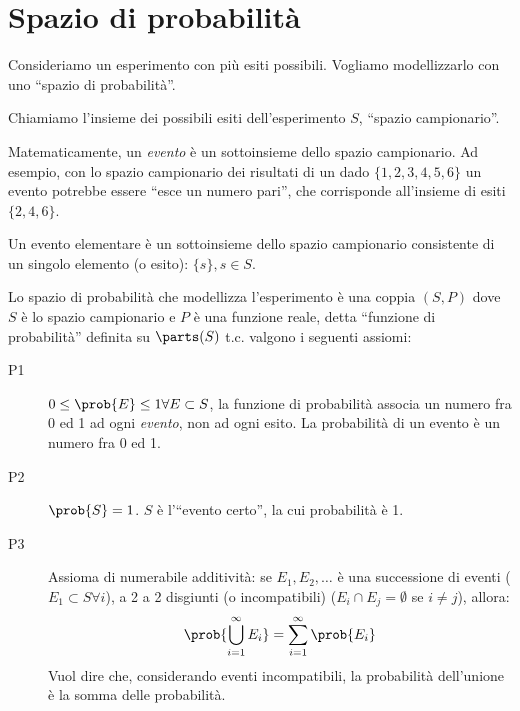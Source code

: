 
\section{Spazio di probabilit\`a}

Consideriamo un esperimento con pi\`u esiti possibili. Vogliamo modellizzarlo con uno ``spazio di probabilit\`a''.

\begin{defn}
Chiamiamo l'insieme dei possibili esiti dell'esperimento $S$, ``spazio campionario''.
\end{defn}

\begin{defn}[Evento]
Matematicamente, un \emph{evento} \`e un sottoinsieme dello spazio campionario. Ad esempio, con lo spazio campionario dei risultati di un dado $\{ 1, 2, 3, 4, 5, 6\}$ un evento potrebbe essere ``esce un numero pari'', che corrisponde all'insieme di esiti $\{2, 4, 6\}$.

Un evento elementare \`e un sottoinsieme dello spazio campionario consistente di un singolo elemento (o esito): $\{ s \}, s \in S$.
\end{defn}

\begin{defn}
Lo spazio di probabilit\`a che modellizza l'esperimento \`e una coppia $(S,P)$ dove $S$ \`e lo spazio campionario e $P$ \`e una funzione reale, detta ``funzione di probabilit\`a'' definita su $\parts(S)$ t.c. valgono i seguenti assiomi:
\begin{description}
    \item[P1\label{itm:P1}] $0 \le \prob{E} \le 1 \forall  E \subset S$, la funzione di probabilit\`a associa un numero fra 0 ed 1 ad ogni \emph{evento}, non ad ogni esito. La probabilit\`a di un evento \`e un numero fra 0 ed 1.
    \item[P2\label{itm:P2}] $\prob{S} = 1$. $S$ \`e l'``evento certo'', la cui probabilit\`a \`e 1.
    \item[P3\label{itm:P3}] Assioma di numerabile additivit\`a: se $E_1, E_2, \dots$ \`e una successione di eventi ($E_1 \subset S \forall  i$), a 2 a 2 disgiunti (o incompatibili) ($E_i \cap E_j = \emptyset$ se $i \neq j$), allora:
    \[
    \prob{\bigcup_{i=1}^{\infty} E_i} = \sum_{i=1}^{\infty} \prob{E_i}
    \]
    Vuol dire che, considerando eventi incompatibili, la probabilit\`a dell'unione \`e la somma delle probabilit\`a. 
\end{description}
\end{defn}

